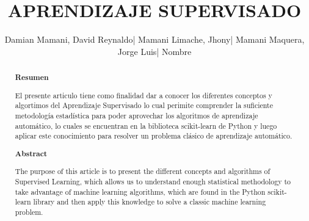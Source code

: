 \documentclass[%
 reprint,
 amsmath,amssymb,
 aps,
]{revtex4-1}
\begin{document}
\title{ APRENDIZAJE SUPERVISADO}
\author{Damian Mamani, David Reynaldo| Mamani Limache, Jhony| Mamani Maquera, Jorge Luis| Nombre}
		
%

\begin{abstract}
\begin{center}
\textbf{Resumen}
\end{center}
El presente articulo tiene como finalidad dar a conocer los diferentes conceptos y algortimos del Aprendizaje Supervisado lo cual perimite comprender la suficiente metodología estadística para poder aprovechar los algoritmos de aprendizaje automático, lo cuales se encuentran en la biblioteca scikit-learn de Python y luego aplicar este conocimiento para resolver un problema clásico de aprendizaje automático.
\\

\begin{center}
\textbf{Abstract}
\end{center}
The purpose of this article is to present the different concepts and algorithms of Supervised Learning, which allows us to understand enough statistical methodology to take advantage of machine learning algorithms, which are found in the Python scikit-learn library and then apply this knowledge to solve a classic machine learning problem.
\\
\end{abstract}



\maketitle

\end{document}
